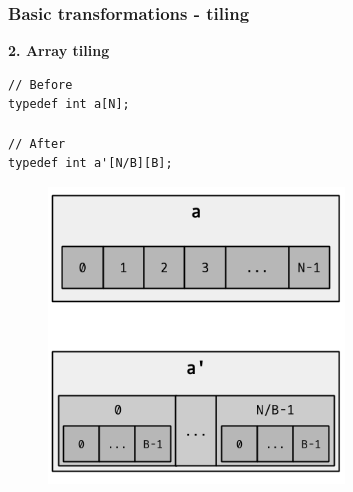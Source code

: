 \begin{frame}[fragile]
\frametitle{Basic transformations - tiling}

\begin{center}
\begin{minipage}{0.3\linewidth}
\textbf{\small 2. Array tiling}
\begin{lstlisting}[style=Cstyle, basicstyle=\scriptsize]
// Before
typedef int a[N];

// After
typedef int a'[N/B][B];
\end{lstlisting}
\end{minipage}%
\begin{minipage}{0.5\linewidth}
\begin{figure}
	\centering
	\includegraphics[width=0.7\textwidth]{images/tiling}
\end{figure}
\end{minipage}
\end{center}

\end{frame}



